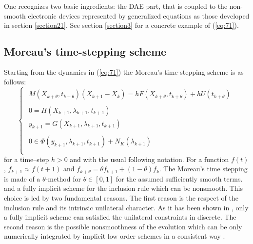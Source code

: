 One recognizes two basic ingredients: the DAE part, that is coupled to the non-smooth electronic devices represented by generalized equations as those developed in section \ref{section21}. See section \ref{section3} for a concrete example of (\ref{eq:71}). 


\subsection{Moreau's time-stepping scheme}


Starting from the dynamics in (\ref{eq:71}) the Moreau's time-stepping scheme  is as follows:
\label{section24}
\begin{equation}
  \label{eq:71-discrete}
 \left\{ \begin{array}{l}
    \begin{array}{l}
  M(X_{k+\theta},t_{k+\theta}) (X_{k+1}-X_{k}) = h F(X_{k+\theta},t_{k+\theta}) + h U(t_{k+\theta})
\end{array}\\[2mm]
  \begin{array}{l}
    0 = H(X_{k+1},\lambda_{k+1},t_{k+1})\\
    y_{k+1} = G(X_{k+1},\lambda_{k+1},t_{k+1}) 
  \end{array} \\[5mm]
  \begin{array}{l}
  0 \in \Phi(y_{k+1},\lambda_{k+1},t_{k+1}) + N_K(\lambda_{k+1})
\end{array} \\
\end{array}\right.
\end{equation}
for a time--step $h>0$ and with the usual following notation. For a function $f(t)$, $ f_{k+1} \approx f(t+1)$ and $f_{k+\theta} = \theta f_{k+1} + (1-\theta) f_{k}$. The Moreau's time stepping is made of a $\theta$-method for $\theta \in [0,1]$ for the assumed sufficiently smooth terms. and a fully implicit scheme for the inclusion rule which can be nonsmooth. This choice is led by two fundamental reasons. The first reason is the respect of the inclusion rule and its intrinsic unilateral character.  As it has been shown in \cite{} ,  only a fully implicit scheme can satisfied the unilateral constraints in discrete. The second reason is the possible nonsmoothness of the evolution  which  can be only  numerically integrated by  implicit low order schemes in a consistent way \cite{}.

